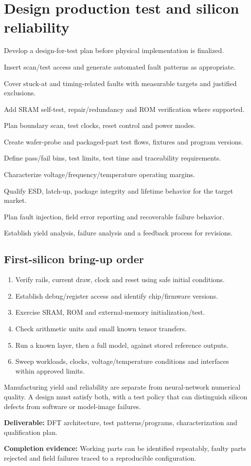 \documentclass[11pt,a4paper]{article}
\newcommand{\phase}[2]{\clearpage\section{#1}\label{#2}}
\newcommand{\deliver}[2]{\begin{tcolorbox}[colback=pale,colframe=line,boxrule=0.5pt,arc=1mm,left=8pt,right=8pt,top=6pt,bottom=6pt]\textbf{Deliverable:} #1\par\textbf{Completion evidence:} #2\end{tcolorbox}}
\begin{document}
\phase{Design production test and silicon reliability}{sec:test}
\begin{checklist}
\item Develop a design-for-test plan before physical implementation is finalized.
\item Insert scan/test access and generate automated fault patterns as appropriate.
\item Cover stuck-at and timing-related faults with measurable targets and justified exclusions.
\item Add SRAM self-test, repair/redundancy and ROM verification where supported.
\item Plan boundary scan, test clocks, reset control and power modes.
\item Create wafer-probe and packaged-part test flows, fixtures and program versions.
\item Define pass/fail bins, test limits, test time and traceability requirements.
\item Characterize voltage/frequency/temperature operating margins.
\item Qualify ESD, latch-up, package integrity and lifetime behavior for the target market.
\item Plan fault injection, field error reporting and recoverable failure behavior.
\item Establish yield analysis, failure analysis and a feedback process for revisions.
\end{checklist}
\subsection*{First-silicon bring-up order}
\begin{enumerate}
\item Verify rails, current draw, clock and reset using safe initial conditions.
\item Establish debug/register access and identify chip/firmware versions.
\item Exercise SRAM, ROM and external-memory initialization/test.
\item Check arithmetic units and small known tensor transfers.
\item Run a known layer, then a full model, against stored reference outputs.
\item Sweep workloads, clocks, voltage/temperature conditions and interfaces within approved limits.
\end{enumerate}
Manufacturing yield and reliability are separate from neural-network numerical
quality. A design must satisfy both, with a test policy that can distinguish
silicon defects from software or model-image failures.
\deliver{DFT architecture, test patterns/programs, characterization and qualification
plan.}{Working parts can be identified repeatably, faulty parts rejected and field
failures traced to a reproducible configuration.}
\end{document}
